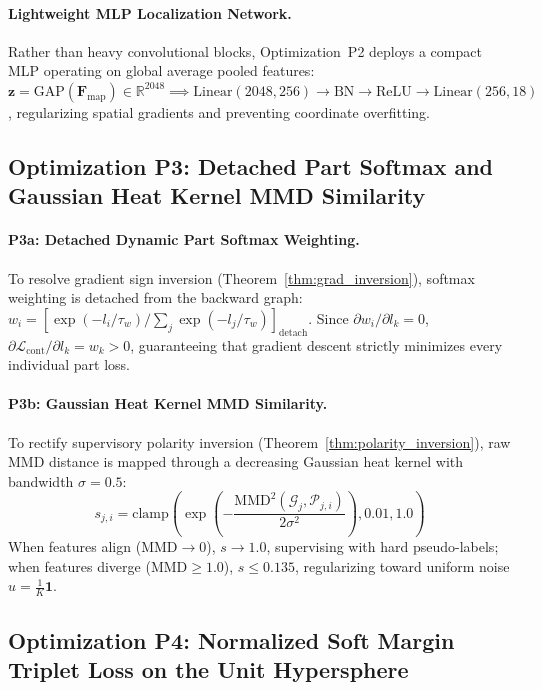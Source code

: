 \paragraph{Lightweight MLP Localization Network.}
Rather than heavy convolutional blocks, Optimization~P2 deploys a compact MLP operating on global average pooled features: $\mathbf{z} = \text{GAP}(\mathbf{F}_{\text{map}}) \in \mathbb{R}^{2048} \implies \text{Linear}(2048, 256) \to \text{BN} \to \text{ReLU} \to \text{Linear}(256, 18)$, regularizing spatial gradients and preventing coordinate overfitting.

\subsection{Optimization P3: Detached Part Softmax and Gaussian Heat Kernel MMD Similarity}
\label{subsec:opt_p3}

\paragraph{P3a: Detached Dynamic Part Softmax Weighting.}
To resolve gradient sign inversion (Theorem~\ref{thm:grad_inversion}), softmax weighting is detached from the backward graph: $w_i = [\exp(-l_i / \tau_w) / \sum_j \exp(-l_j / \tau_w)]_{\text{detach}}$. Since $\partial w_i / \partial l_k = 0$, $\partial \mathcal{L}_{\text{cont}} / \partial l_k = w_k > 0$, guaranteeing that gradient descent strictly minimizes every individual part loss.

\paragraph{P3b: Gaussian Heat Kernel MMD Similarity.}
To rectify supervisory polarity inversion (Theorem~\ref{thm:polarity_inversion}), raw MMD distance is mapped through a decreasing Gaussian heat kernel with bandwidth $\sigma = 0.5$:
\begin{equation}
s_{j, i} = \text{clamp}\left( \exp\left( -\frac{\text{MMD}^2(\mathcal{G}_j, \mathcal{P}_{j, i})}{2\sigma^2} \right), 0.01, 1.0 \right)
\end{equation}
When features align ($\text{MMD} \to 0$), $s \to 1.0$, supervising with hard pseudo-labels; when features diverge ($\text{MMD} \ge 1.0$), $s \le 0.135$, regularizing toward uniform noise $u = \frac{1}{K}\mathbf{1}$.

\subsection{Optimization P4: Normalized Soft Margin Triplet Loss on the Unit Hypersphere}
\label{subsec:opt_p4}

